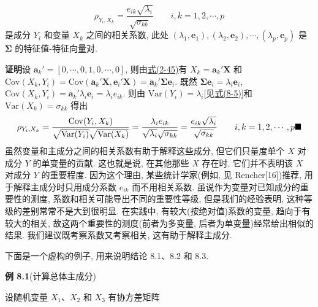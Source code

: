 \label{eq:8-8}
\begin{equation}
\rho_{Y_i,X_k}=\frac{e_{ik}\sqrt{\lambda_i}}{\sqrt{\sigma_{kk}}}\qquad i,k=1,2,\cdots,p
\tag{8-8}
\end{equation}
是成分 $Y_i$ 和变量 $X_k$ 之间的相关系数, 此处 $(\lambda_1,\mathbf{e}_1),(\lambda_2,\mathbf{e}_2),\cdots,(\lambda_p,\mathbf{e}_p)$ 是 $\boldsymbol{\Sigma}$ 的特征值-特征向量对.

\noindent\textbf{证明}\quad 设 $\mathbf{a}_k'=[0,\cdots,0,1,0,\cdots,0]$, 则由\hyperref[eq:2-45]{式(2-45)}有 $X_k=\mathbf{a}_k'\mathbf{X}$ 和 $\mathrm{Cov}(X_k,Y_i)=\mathrm{Cov}(\mathbf{a}_k'\mathbf{X},\mathbf{e}_i'\mathbf{X})=\mathbf{a}_k'\boldsymbol{\Sigma}\mathbf{e}_i$. 既然 $\boldsymbol{\Sigma}\mathbf{e}_i=\lambda_i\mathbf{e}_i$, $\mathrm{Cov}(X_k,Y_i)=\mathbf{a}_k'\lambda_i\mathbf{e}_i=\lambda_i e_{ik}$. 则由 $\mathrm{Var}(Y_i)=\lambda_i$[见\hyperref[eq:8-5]{式(8-5)}]和 $\mathrm{Var}(X_k)=\sigma_{kk}$ 得出
\[
\rho_{Y_i,X_k}=\frac{\mathrm{Cov}(Y_i,X_k)}{\sqrt{\mathrm{Var}(Y_i)}\sqrt{\mathrm{Var}(X_k)}}=\frac{\lambda_i e_{ik}}{\sqrt{\lambda_i}\sqrt{\sigma_{kk}}}=\frac{e_{ik}\sqrt{\lambda_i}}{\sqrt{\sigma_{kk}}}\qquad i,k=1,2,\cdots,p \hfill\blacksquare
\]
虽然变量和主成分之间的相关系数有助于解释这些成分, 但它们只量度单个 $X$ 对成分 $Y$ 的单变量的贡献. 这也就是说, 在其他那些 $X$ 存在时, 它们并不表明该 $X$ 对成分 $Y$ 的重要程度. 因为这个理由, 某些统计学家(例如, 见 Rencher[16])推荐, 用于解释主成分时只用成分系数 $e_{ik}$ 而不用相关系数. 虽说作为变量对已知成分的重要性的测度, 系数和相关可能导出不同的重要性等级, 但是我们的经验表明, 这种等级的差别常常不是大到很明显. 在实践中, 有较大(按绝对值)系数的变量, 趋向于有较大的相关, 故这两个重要性的测度(前者为多变量, 后者为单变量)经常给出相似的结果. 我们建议既考察系数又考察相关, 这有助于解释主成分.

下面是一个虚构的例子, 用来说明结论 8.1、8.2 和 8.3.

\noindent\textbf{例 8.1}\quad (计算总体主成分)

设随机变量 $X_1$、$X_2$ 和 $X_3$ 有协方差矩阵
